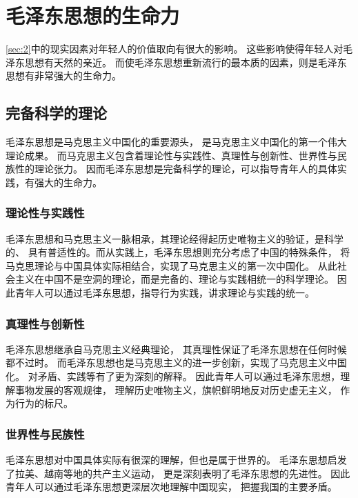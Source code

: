 \documentclass{ctexart}
\begin{document}
\section{毛泽东思想的生命力}

\ref{sec:2}中的现实因素对年轻人的价值取向有很大的影响。
这些影响使得年轻人对毛泽东思想有天然的亲近。
而使毛泽东思想重新流行的最本质的因素，则是毛泽东思想有非常强大的生命力。

\subsection{完备科学的理论}

毛泽东思想是马克思主义中国化的重要源头，
是马克思主义中国化的第一个伟大理论成果。
而马克思主义包含着理论性与实践性、真理性与创新性、世界性与民族性的理论张力。
因而毛泽东思想是完备科学的理论，可以指导青年人的具体实践，有强大的生命力。

\subsubsection{理论性与实践性}

毛泽东思想和马克思主义一脉相承，其理论经得起历史唯物主义的验证，是科学的、
具有普适性的。而从实践上，毛泽东思想则充分考虑了中国的特殊条件，
将马克思理论与中国具体实际相结合，实现了马克思主义的第一次中国化。
从此社会主义在中国不是空洞的理论，而是完备的、理论与实践相统一的科学理论。
因此青年人可以通过毛泽东思想，指导行为实践，讲求理论与实践的统一。

\subsubsection{真理性与创新性}

毛泽东思想继承自马克思主义经典理论，
其真理性保证了毛泽东思想在任何时候都不过时。
而毛泽东思想也是马克思主义的进一步创新，实现了马克思主义中国化。
对矛盾、实践等有了更为深刻的解释。
因此青年人可以通过毛泽东思想，理解事物发展的客观规律，
理解历史唯物主义，旗帜鲜明地反对历史虚无主义，
作为行为的标尺。

\subsubsection{世界性与民族性}

毛泽东思想对中国具体实际有很深的理解，但也是属于世界的。
毛泽东思想启发了拉美、越南等地的共产主义运动，
更是深刻表明了毛泽东思想的先进性。
因此青年人可以通过毛泽东思想更深层次地理解中国现实，
把握我国的主要矛盾。
\end{document}
